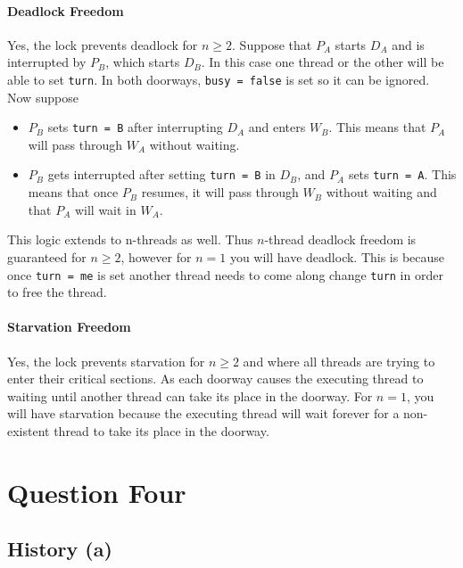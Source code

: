 \documentclass[12pt,letterpaper,titlepage]{article}
\begin{document}
    \paragraph{Deadlock Freedom} Yes, the lock prevents deadlock for $n \ge 2$. Suppose that $P_A$ starts $D_A$ and is interrupted by $P_B$, which starts $D_B$. In this case one thread or the other will be able to set \texttt{turn}. In both doorways, \texttt{busy = false} is set so it can be ignored. Now suppose
    \begin{itemize}
      \item $P_B$ sets \texttt{turn = B} after interrupting $D_A$ and enters $W_B$. This means that $P_A$ will pass through $W_A$ without waiting.
      \item $P_B$ gets interrupted after setting \texttt{turn = B} in $D_B$, and $P_A$ sets \texttt{turn = A}. This means that once $P_B$ resumes, it will pass through $W_B$ without waiting and that $P_A$ will wait in $W_A$.
    \end{itemize}
    This logic extends to n-threads as well. Thus $ n $-thread deadlock freedom is guaranteed for $n \ge 2$, however for $n=1$ you will have deadlock. This is because once \texttt{turn = me} is set another thread needs to come along change \texttt{turn} in order to free the thread.
     
    \paragraph{Starvation Freedom} Yes, the lock prevents starvation for $n \ge 2$ and where all threads are trying to enter their critical sections. As each doorway causes the executing thread to waiting until another thread can take its place in the doorway. For $n=1$, you will have starvation because the executing thread will wait forever for a non-existent thread to take its place in the doorway.
  
  \section{Question Four}
  \subsection{History (a)}
\end{document}
